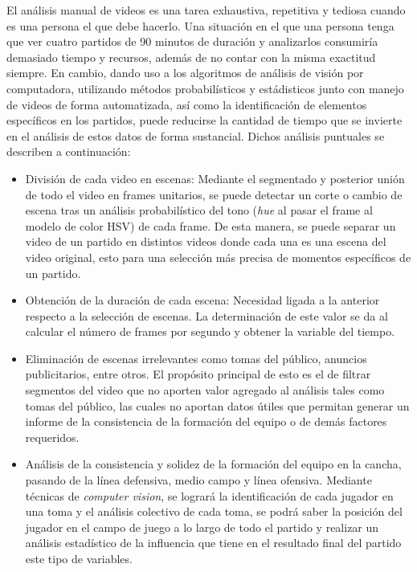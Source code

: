 \documentclass[a4paper]{article}
\begin{document}
{    El análisis manual de videos es una tarea exhaustiva, repetitiva y tediosa cuando es una persona el que debe hacerlo. Una situación en el que una persona tenga que ver cuatro partidos de 90 minutos de duración y analizarlos consumiría demasiado tiempo y recursos, además de no contar con la misma exactitud siempre. En cambio, dando uso a los algoritmos de análisis de visión por computadora, utilizando métodos probabilísticos y estádisticos junto con manejo de videos de forma automatizada, así como la identificación de elementos específicos en los partidos, puede reducirse la cantidad de tiempo que se invierte en el análisis de estos datos de forma sustancial. Dichos análisis puntuales se describen a continuación: \\
    
	\begin{itemize}
    	\item División de cada video en escenas: Mediante el segmentado y posterior unión de todo el video en frames unitarios, se puede detectar un corte o cambio de escena tras un análisis probabilístico del tono (\textit{hue} al pasar el frame al modelo de color HSV) de cada frame. De esta manera, se puede separar un video de un partido en distintos videos donde cada una es una escena del video original, esto para una selección más precisa de momentos específicos de un partido. 
        \item Obtención de la duración de cada escena: Necesidad ligada a la anterior respecto a la selección de escenas. La determinación de este valor se da al calcular el número de frames por segundo y obtener la variable del tiempo.
        \item Eliminación de escenas irrelevantes como tomas del público, anuncios publicitarios, entre otros. El propósito principal de esto es el de filtrar segmentos del video que no aporten valor agregado al análisis tales como tomas del público, las cuales no aportan datos útiles que permitan generar un informe de la consistencia de la formación del equipo  o de demás factores requeridos.
       	\item Análisis de la consistencia y solidez de la formación del equipo en la cancha, pasando de la línea defensiva, medio campo y línea ofensiva. Mediante técnicas de \textit{computer vision}, se logrará la identificación de cada jugador en una toma y el análisis colectivo de cada toma, se podrá saber la posición del jugador en el campo de juego a lo largo de todo el partido y realizar un análisis estadístico de la influencia que tiene en el resultado final del partido este tipo de variables. 

\end{itemize}}
\end{document}

